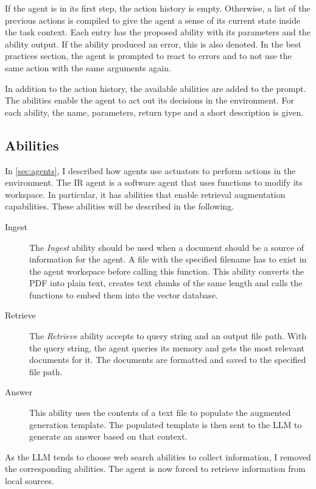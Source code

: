 \documentclass[../main.tex]{subfiles}
\begin{document}
If the agent is in its first step, the action history is empty.
Otherwise, a list of the previous actions is compiled to give the agent a sense of its current state inside the task context.
Each entry has the proposed ability with its parameters and the ability output.
If the ability produced an error, this is also denoted.
In the best practices section, the agent is prompted to react to errors and to not use the same action with the same arguments again.

In addition to the action history, the available abilities are added to the prompt.
The abilities enable the agent to act out its decisions in the environment.
For each ability, the name, parameters, return type and a short description is given.

\subsection{Abilities}

In \autoref{sec:agents}, I described how agents use actuators to perform actions in the environment.
The IR agent is a software agent that uses functions to modify its workspace.
In particular, it has abilities that enable retrieval augmentation capabilities.
These abilities will be described in the following.

\begin{description}
    \item[Ingest] The \emph{Ingest} ability should be used
        when a document should be a source of information for the agent.
        A file with the specified filename has to exist in the agent workspace before calling this function.
        This ability converts the PDF into plain text, creates text chunks of the same length
        and calls the functions to embed them into the vector database.
    \item[Retrieve] The \emph{Retrieve} ability accepts to query string and an output file path.
        With the query string, the agent queries its memory and gets the most relevant documents for it.
        The documents are formatted and saved to the specified file path.
    \item[Answer] This ability uses the contents of a text file to populate the augmented generation template.
        The populated template is then sent to the LLM to generate an answer based on that context.
\end{description}

As the LLM tends to choose web search abilities to collect information, I removed the corresponding abilities.
The agent is now forced to retrieve information from local sources.
\end{document}
